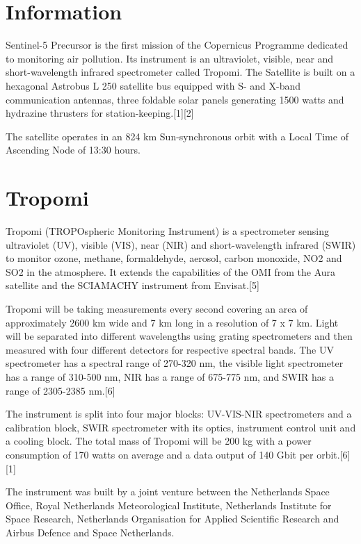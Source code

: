 \documentclass[12pt]{report}	%
\begin{document}
\section{Information}
Sentinel-5 Precursor is the first mission of the Copernicus Programme dedicated to monitoring air pollution. Its instrument is an ultraviolet, visible, near and short-wavelength infrared spectrometer called Tropomi. The Satellite is built on a hexagonal Astrobus L 250 satellite bus equipped with S- and X-band communication antennas, three foldable solar panels generating 1500 watts and hydrazine thrusters for station-keeping.[1][2]

The satellite operates in an 824 km Sun-synchronous orbit with a Local Time of Ascending Node of 13:30 hours.


\section{Tropomi}
Tropomi (TROPOspheric Monitoring Instrument) is a spectrometer sensing ultraviolet (UV), visible (VIS), near (NIR) and short-wavelength infrared (SWIR) to monitor ozone, methane, formaldehyde, aerosol, carbon monoxide, NO2 and SO2 in the atmosphere. It extends the capabilities of the OMI from the Aura satellite and the SCIAMACHY instrument from Envisat.[5]

Tropomi will be taking measurements every second covering an area of approximately 2600 km wide and 7 km long in a resolution of 7 x 7 km. Light will be separated into different wavelengths using grating spectrometers and then measured with four different detectors for respective spectral bands. The UV spectrometer has a spectral range of 270-320 nm, the visible light spectrometer has a range of 310-500 nm, NIR has a range of 675-775 nm, and SWIR has a range of 2305-2385 nm.[6]

The instrument is split into four major blocks: UV-VIS-NIR spectrometers and a calibration block, SWIR spectrometer with its optics, instrument control unit and a cooling block. The total mass of Tropomi will be 200 kg with a power consumption of 170 watts on average and a data output of 140 Gbit per orbit.[6][1]

The instrument was built by a joint venture between the Netherlands Space Office, Royal Netherlands Meteorological Institute, Netherlands Institute for Space Research, Netherlands Organisation for Applied Scientific Research and Airbus Defence and Space Netherlands.
\end{document}
